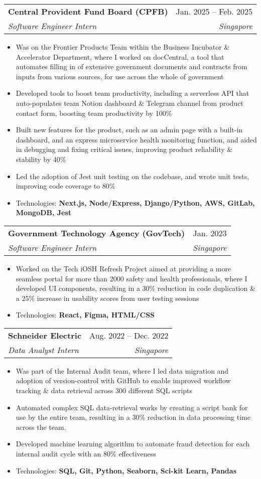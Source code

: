 \documentclass[letterpaper,11pt]{article}
\makeatletter
\newcommand{\resumeItem}[1]{
  \item\small{
    {#1 \vspace{-2pt}}
  }
}
\newcommand{\resumeSubheading}[4]{
  \vspace{-2pt}\item
    \begin{tabular*}{0.97\textwidth}[t]{l@{\extracolsep{\fill}}r}
      \textbf{#1} & #2 \\
      \textit{\small#3} & \textit{\small #4} \\
    \end{tabular*}\vspace{-7pt}
}
\newcommand{\resumeItemListStart}{\begin{itemize}}
\newcommand{\resumeItemListEnd}{\end{itemize}\vspace{-5pt}}
\makeatother
\begin{document}
    \resumeSubheading
    {Central Provident Fund Board (CPFB)}{Jan. 2025 -- Feb. 2025}
    {Software Engineer Intern}{Singapore}
    \resumeItemListStart
      \resumeItem{Was on the Frontier Products Team within the Business Incubator \& Accelerator Department, where I worked on docCentral, a tool that automates filling in of extensive government documents and contracts from inputs from various sources, for use across the whole of government}
      \resumeItem{Developed tools to boost team productivity, including a serverless API that auto-populates team Notion dashboard \& Telegram channel from product contact form, boosting team productivity by 100\%} 
      \resumeItem{Built new features for the product, such as an admin page with a built-in dashboard, and an express microservice health monitoring function, and aided in debugging and fixing critical issues, improving product reliability \& stability by 40\%}
      \resumeItem{Led the adoption of Jest unit testing on the codebase, and wrote unit tests, improving code coverage to 80\%}
      \resumeItem{Technologies: \textbf{Next.js, Node/Express, Django/Python, AWS, GitLab, MongoDB, Jest}}
    \resumeItemListEnd

    \resumeSubheading
      {Government Technology Agency (GovTech)}{Jan. 2023}
      {Software Engineer Intern}{Singapore}
      \resumeItemListStart
        \resumeItem{Worked on the Tech iOSH Refresh Project aimed at providing a more seamless portal for more than 2000 safety and health professionals, where I developed UI components, resulting in a 30\% reduction in code duplication \& a 25\% increase in usability scores from user testing sessions}
        \resumeItem{Technologies: \textbf{React, Figma, HTML/CSS}}
      \resumeItemListEnd

    \resumeSubheading
      {Schneider Electric}{Aug. 2022 -- Dec. 2022}
      {Data Analyst Intern}{Singapore}
      \resumeItemListStart
        \resumeItem{Was part of the Internal Audit team, where I led data migration and adoption of version-control with GitHub to enable improved workflow tracking \& data retrieval across 300 different SQL scripts}
        \resumeItem{Automated complex SQL data-retrieval works by creating a script bank for use by the entire team, resulting in a 30\% reduction in data processing time across the team.}
        \resumeItem{Developed machine learning algorithm to automate fraud detection for each internal audit cycle with an 80\% effectiveness}
        \resumeItem{Technologies: \textbf{SQL, Git, Python, Seaborn, Sci-kit Learn, Pandas}}
      \resumeItemListEnd
\end{document}
